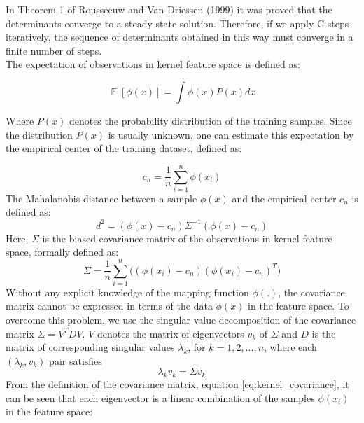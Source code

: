\documentclass[preprint,12pt]{elsarticle}
\begin{document}
In Theorem 1 of Rousseeuw and Van Driessen (1999) it was proved that the determinants converge to a steady-state solution. Therefore, if we apply C-steps iteratively, the sequence of
determinants obtained in this way must converge in a finite number of steps. \\


The expectation of observations in kernel feature space is defined as:

\begin{equation}
\mathop{\mathbb{E}}[\phi(x)] = \int \phi(x) P(x) dx
\end{equation}

Where $P(x)$ denotes the probability distribution of the training samples. Since the
distribution $P(x)$ is usually unknown, one can estimate this expectation by the empirical
center of the training dataset, defined as:

\begin{equation}
	c_n = \frac{1}{n} \sum_{i=1}^{n} \phi(x_i)
\end{equation}
The Mahalanobis distance between a sample $\phi(x)$ and the empirical
center $c_n$ is defined as:
\begin{equation}
	d^2 = (\phi(x) - c_n) \Sigma^{-1} (\phi(x) - c_n)
\end{equation}
Here, $\Sigma$ is the biased covariance matrix of the observations in kernel feature space, formally defined as:
\begin{equation}
	\Sigma = \frac{1}{n} \sum_{i=1}^{n}	\big( (\phi(x_i) - c_n) (\phi(x_i) - c_n)^T \big)
	\label{eq:kernel_covariance}
\end{equation}
Without any explicit knowledge of the mapping function $\phi(.)$, the covariance matrix
cannot be expressed in terms of the data $\phi(x)$ in the feature space. To overcome this problem, we use the singular value decomposition of the covariance matrix $\Sigma = V^T D V$. $V$ denotes the matrix of eigenvectors $v_k$ of $\Sigma$ and $D$ is the matrix of corresponding singular values $\lambda_k$, for $k = 1, 2, ..., n$, where each $(\lambda_k, v_k)$ pair satisfies   
\begin{equation}
	\lambda_k v_k = \Sigma v_k
\end{equation}
From the definition of the covariance matrix, equation \ref{eq:kernel_covariance}, it can be seen that each eigenvector is a linear
combination of the samples $\phi(x_i)$ in the feature space:

\end{document}
